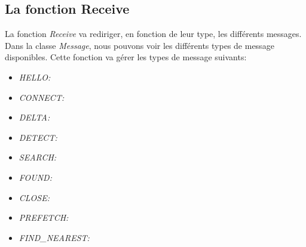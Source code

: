 \documentclass[11pt,a4paper]{article}
\begin{document}
\subsection{La fonction Receive}
La fonction \textit{Receive} va rediriger, en fonction de leur type, les différents messages. Dans la classe \textit{Message}, nous pouvons voir les différents types de message disponibles. Cette fonction va gérer les types de message suivants:
\begin{itemize}
	\renewcommand{\labelitemi}{$\bullet$}
	\item \textit{HELLO:}
	\item \textit{CONNECT:}
	\item \textit{DELTA:}
	\item \textit{DETECT:}
	\item \textit{SEARCH:}
	\item \textit{FOUND:}
	\item \textit{CLOSE:}
	\item \textit{PREFETCH:}
	\item \textit{FIND\_NEAREST:}
\end{itemize}

\newpage




 
\end{document}
